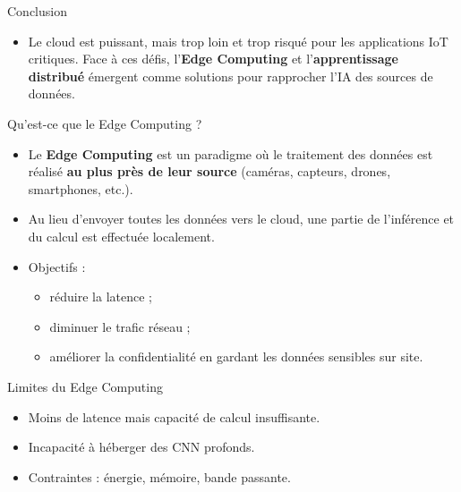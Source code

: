 \documentclass{beamer}
\begin{document}
\begin{frame}{}
\begin{block}{Conclusion}
\begin{itemize}
    \item Le cloud est puissant, mais trop loin et trop risqué pour les applications IoT critiques. Face à ces défis, l’\textbf{Edge Computing} et l’\textbf{apprentissage distribué} émergent comme solutions pour rapprocher l’IA des sources de données.
\end{itemize}
\end{block}
\end{frame}

\begin{frame}{Qu'est-ce que le Edge Computing ?}

\begin{itemize}
    \item Le \textbf{Edge Computing} est un paradigme où le traitement des données 
    est réalisé \textbf{au plus près de leur source} (caméras, capteurs, drones, smartphones, etc.).
    \item Au lieu d'envoyer toutes les données vers le cloud, 
    une partie de l'inférence et du calcul est effectuée localement.
    \item Objectifs :
    \begin{itemize}
        \item réduire la latence ;
        \item diminuer le trafic réseau ;
        \item améliorer la confidentialité en gardant les données sensibles sur site.
    \end{itemize}
\end{itemize}

\end{frame}

\begin{frame}{Limites du Edge Computing}
\begin{itemize}
    \item Moins de latence mais capacité de calcul insuffisante.
    \item Incapacité à héberger des CNN profonds.
    \item Contraintes : énergie, mémoire, bande passante.
\end{itemize}
\end{frame}
\end{document}
